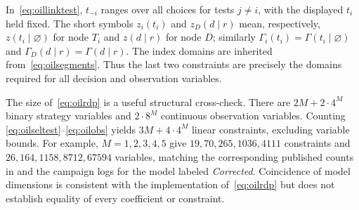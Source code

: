 \documentclass[11pt,a4paper]{article}
\begin{document}
In~\eqref{eq:oillinktest}, $t_{-i}$ ranges over all choices for
tests $j\ne i$, with the displayed $t_i$ held fixed.
The short symbols $z_i(t_i)$ and $z_D(d\mid r)$ mean, respectively,
$z(t_i\mid\varnothing)$ for node $T_i$ and $z(d\mid r)$ for
node $D$; similarly $\Gamma_i(t_i)=\Gamma(t_i\mid\varnothing)$
and $\Gamma_D(d\mid r)=\Gamma(d\mid r)$.
The index domains are inherited from~\eqref{eq:oilsegments}.
Thus the last two constraints are precisely the domains required for
all decision and observation variables.

The size of~\eqref{eq:oilrdp} is a useful structural cross-check.
There are $2M+2\cdot4^M$ binary strategy variables and
$2\cdot8^M$ continuous observation variables.  Counting
\eqref{eq:oilseltest}--\eqref{eq:oilobs} yields
$3M+4\cdot4^M$ linear constraints, excluding variable bounds.
For example, $M=1,2,3,4,5$ give $19,70,265,1036,4111$
constraints and $26,164,1158,8712,67594$ variables, matching
the corresponding published counts in
\cite[Table~6]{Terho2026} and the campaign logs for the model
labeled \emph{Corrected}.  Coincidence of model dimensions is
consistent with the implementation of~\eqref{eq:oilrdp} but does
not establish equality of every coefficient or constraint.
\end{document}
